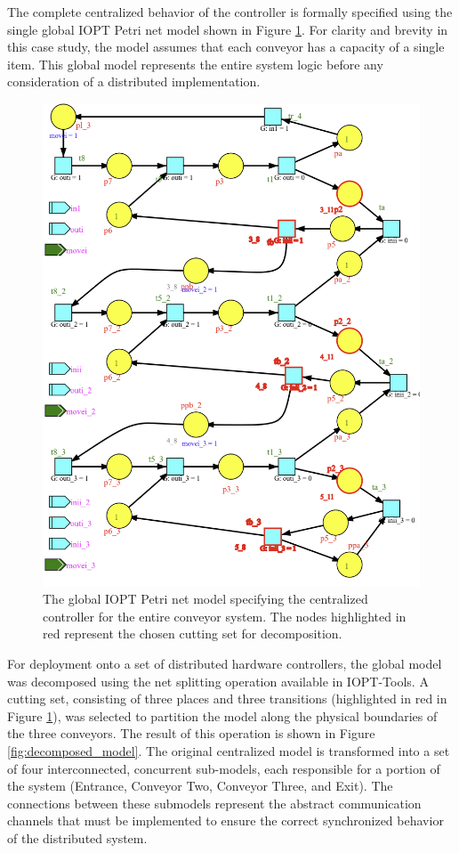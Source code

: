The complete centralized behavior of the controller is formally specified using the single global IOPT Petri net model shown in Figure \ref{fig:global_model}. For clarity and brevity in this case study, the model assumes that each conveyor has a capacity of a single item. This global model represents the entire system logic before any consideration of a distributed implementation.

\begin{figure}[htb]
    \centering
    \includegraphics[width=0.95\columnwidth]{Chapters/Figures/modeloglobalcomcuttingset.png}
    \caption{The global IOPT Petri net model specifying the centralized controller for the entire conveyor system. The nodes highlighted in red represent the chosen cutting set for decomposition.}
    \label{fig:global_model}
\end{figure}

For deployment onto a set of distributed hardware controllers, the global model was decomposed using the net splitting operation available in IOPT-Tools. A cutting set, consisting of three places and three transitions (highlighted in red in Figure \ref{fig:global_model}), was selected to partition the model along the physical boundaries of the three conveyors. The result of this operation is shown in Figure \ref{fig:decomposed_model}. The original centralized model is transformed into a set of four interconnected, concurrent sub-models, each responsible for a portion of the system (Entrance, Conveyor Two, Conveyor Three, and Exit). The connections between these submodels represent the abstract communication channels that must be implemented to ensure the correct synchronized behavior of the distributed system.

